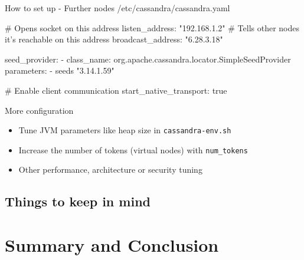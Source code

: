 \documentclass[10pt]{beamer}
\begin{document}
\begin{frame}[fragile]{How to set up - Further nodes}
  /etc/cassandra/cassandra.yaml
  \begin{semiverbatim}
  # Opens socket on this address
  listen_address: "192.168.1.2"
  # Tells other nodes it's reachable on this address
  broadcast_address: "6.28.3.18"

  seed_provider:
    - class_name: org.apache.cassandra.locator.SimpleSeedProvider
      parameters:
        - seeds "3.14.1.59"

  # Enable client communication
  start_native_transport: true
  \end{semiverbatim}
\end{frame}

\begin{frame}{More configuration}
  \begin{itemize}
    \item Tune JVM parameters like heap size in \lstinline{cassandra-env.sh}
    \item Increase the number of tokens (virtual nodes) with \lstinline{num_tokens}
    \item Other performance, architecture or security tuning
  \end{itemize}
\end{frame}

\subsection{Things to keep in mind}

\section{Summary and Conclusion}
\end{document}

